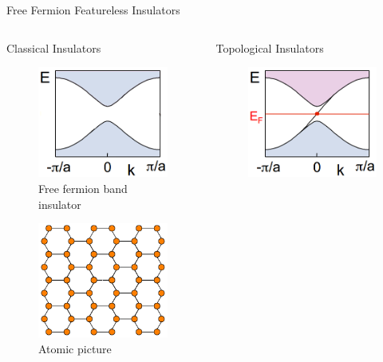 \begin{frame}{Free Fermion Featureless Insulators}
\vskip-1.5cm			
\begin{columns}[T]
\begin{column}[T]{.5\textwidth}
		\begin{block}{Classical Insulators}
			\vskip-0.3cm
	  	\begin{figure}
				\includegraphics[width=0.5\linewidth]{diagrams/band_insulator_2.png}
				\caption{Free fermion band insulator}
			\end{figure}
			\begin{figure}
			\vskip-0.6cm
				\includegraphics[width=0.5\linewidth]{diagrams/filled_honeycomb.pdf}
				\caption{Atomic picture}
			\end{figure}
		\end{block}
\end{column}
\begin{column}[T]{.5\textwidth}
	\begin{block}{Topological Insulators}
		\vskip-0.3cm
		\begin{figure}
			\includegraphics[width=0.5\linewidth]{diagrams/chiral_edge.png}

\end{figure}
\end{block}
\end{column}
\end{columns}
\end{frame}
